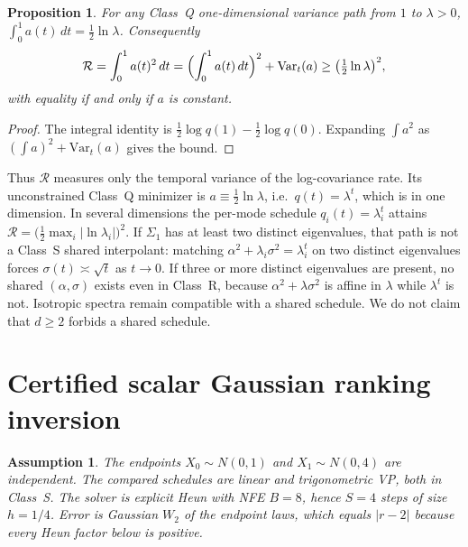 \documentclass[11pt,a4paper]{article}
\newtheorem{proposition}{Proposition}
\newtheorem{assumption}{Assumption}
\theoremstyle{remark}
\newcommand{\wtwo}{W_2}
\newcommand{\cR}{\mathcal{R}}
\begin{document}
\begin{proposition}
\label{prop:cs}
For any Class~Q one-dimensional variance path from $1$ to $\lambda>0$,
$\int_0^1 a(t)\,dt=\tfrac12\ln\lambda$. Consequently
\begin{equation}
  \cR=\int_0^1 a(t)^2\,dt
  =\Bigl(\int_0^1 a(t)\,dt\Bigr)^2+\mathrm{Var}_t(a)
  \ge \bigl(\tfrac12\ln\lambda\bigr)^2,
\end{equation}
with equality if and only if $a$ is constant.
\end{proposition}

\begin{proof}
The integral identity is $\tfrac12\log q(1)-\tfrac12\log q(0)$. Expanding
$\int a^2$ as $(\int a)^2+\mathrm{Var}_t(a)$ gives the bound.
\end{proof}

Thus $\cR$ measures only the temporal variance of the log-covariance rate.
Its unconstrained Class~Q minimizer is $a\equiv\tfrac12\ln\lambda$, i.e.\
$q(t)=\lambda^t$, which is \citet[Example~3.3]{lipschitzguided2025} in one
dimension. In several dimensions the per-mode schedule $q_i(t)=\lambda_i^t$
attains $\cR=\bigl(\tfrac12\max_i|\ln\lambda_i|\bigr)^2$. If $\Sigma_1$ has
at least two distinct eigenvalues, that path is not a Class~S shared
interpolant: matching $\alpha^2+\lambda_i\sigma^2=\lambda_i^t$ on two
distinct eigenvalues forces $\sigma(t)\asymp\sqrt{t}$ as $t\to 0$. If
three or more distinct eigenvalues are present, no shared
$(\alpha,\sigma)$ exists even in Class~R, because
$\alpha^2+\lambda\sigma^2$ is affine in $\lambda$ while $\lambda^t$ is
not. Isotropic spectra remain compatible with a shared schedule. We do
not claim that $d\ge 2$ forbids a shared schedule.

\section{Certified scalar Gaussian ranking inversion}
\label{sec:scalar}

\begin{assumption}
\label{ass:scalar}
The endpoints $X_0\sim N(0,1)$ and $X_1\sim N(0,4)$ are independent.
The compared schedules are linear and trigonometric VP, both in Class~S.
The solver is explicit Heun with NFE $B=8$, hence $S=4$ steps of size
$h=1/4$. Error is Gaussian $\wtwo$ of the endpoint laws, which equals
$|r-2|$ because every Heun factor below is positive.
\end{assumption}
\end{document}
